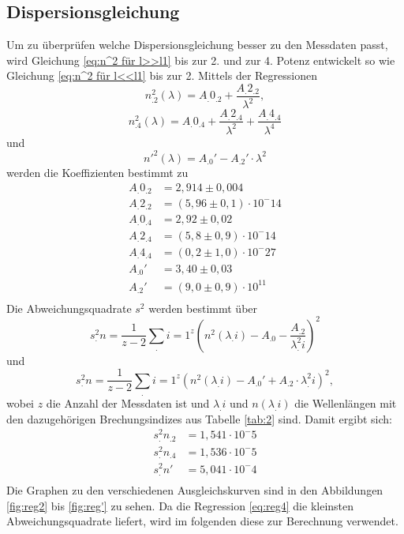 \subsection{Dispersionsgleichung}
\label{sec:Dispersion}
Um zu überprüfen welche Dispersionsgleichung besser zu den Messdaten passt, wird Gleichung \eqref{eq:n^2 für l>>l1} bis zur 2. und zur 4. Potenz entwickelt so wie Gleichung \eqref{eq:n^2 für l<<l1} bis zur 2. 
Mittels der Regressionen
\begin{equation}
n^2_.2 (\lambda)=A_.{0_.2}+\frac{A_.{2_.2}}{\lambda^2},\label{eq:reg2}
\end{equation}
\begin{equation}
n^2_.4 (\lambda)=A_.{0_.4}+\frac{A_.{2_.4}}{\lambda^2}+\frac{A_.{4_.4}}{\lambda^4}\label{eq:reg4}
\end{equation}
und
\begin{equation}
n'^2(\lambda)=A_.0'-A_.2'\cdot \lambda^2\label{eq:reg'}
\end{equation}
werden die Koeffizienten bestimmt zu
\begin{align*}
A_.{0_.2}&= 2,914\pm 0,004 \\
A_.{2_.2}&= (5,96\pm 0,1)\cdot 10^-14 \\
A_.{0_.4}&= 2,92\pm 0,02 \\
A_.{2_.4}&= (5,8\pm 0,9)\cdot 10^-14 \\
A_.{4_.4}&= (0,2\pm 1,0)\cdot 10^-27 \\
A_.0'  &= 3,40\pm 0,03 \\
A_.2'  &= (9,0\pm 0,9)\cdot 10^11 \\
\end{align*}
Die Abweichungsquadrate $s^2$ werden bestimmt über 
\begin{equation}
s^2_.n = \frac{1}{z-2}\sum_.{i=1}^z \left(n^2(\lambda_.i)-A_.0-\frac{A_.2}{\lambda^2_.i}\right)^2
\end{equation}
und
\begin{equation}
s^2_.n = \frac{1}{z-2}\sum_.{i=1}^z \left(n^2(\lambda_.i)-A_.0' +A_.2\cdot\lambda^2_.i\right)^2,
\end{equation}
wobei $z$ die Anzahl der Messdaten ist und $\lambda_.i$ und $n(\lambda_.i)$ die Wellenlängen mit den dazugehörigen Brechungsindizes aus Tabelle \ref{tab:2} sind.
Damit ergibt sich:
\begin{align*}
s^2_.{n_.2}&=1,541\cdot 10^-5 \\
s^2_.{n_.4}&=1,536\cdot 10^-5 \\
s^2_.{n'}&=5,041\cdot 10^-4 \\
\end{align*}
Die Graphen zu den verschiedenen Ausgleichskurven sind in den Abbildungen \ref{fig:reg2} bis \ref{fig:reg'} zu sehen.
Da die Regression \eqref{eq:reg4} die kleinsten Abweichungsquadrate liefert, wird im folgenden diese zur Berechnung verwendet.

